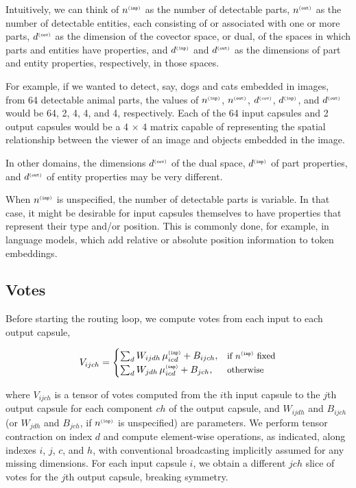 \documentclass[11pt,a4paper]{article}
\newcommand{\suptag}[1]{^{{\scriptscriptstyle\tt (#1)}}}
\newcommand{\cov}{\suptag{cov}}  \newcommand{\inp}{\suptag{inp}}  \newcommand{\out}{\suptag{out}}
\newcommand{\showeqforV}[1]{
	\begin{cases}
		\sum_d W_{ijdh} \, \mu\inp_{icd} + B_{ijch},
		#1 \text{\small if $n\inp$ fixed}
		\\
		\sum_d W_{jdh} \, \mu\inp_{icd} + B_{jch},
		#1 \text{\small otherwise}
	\end{cases}
}
\begin{document}
Intuitively, we can think of $n\inp$ as the number of detectable parts, $n\out$ as the number of detectable entities, each consisting of or associated with one or more parts, $d\cov$ as the dimension of the covector space, or dual, of the spaces in which parts and entities have properties, and $d\inp$ and $d\out$ as the dimensions of part and entity properties, respectively, in those spaces.

For example, if we wanted to detect, say, dogs and cats embedded in images, from 64 detectable animal parts, the values of $n\inp$, $n\out$, $d\cov$, $d\inp$, and $d\out$ would be 64, 2, 4, 4, and 4, respectively. Each of the 64 input capsules and 2 output capsules would be a 4 $\times$ 4 matrix capable of representing the spatial relationship between the viewer of an image and objects embedded in the image.

In other domains, the dimensions $d\cov$ of the dual space, $d\inp$ of part properties, and $d\out$ of entity properties may be very different.

When $n\inp$ is unspecified, the number of detectable parts is variable. In that case, it might be desirable for input capsules themselves to have properties that represent their type and/or position. This is commonly done, for example, in language models, which add relative or absolute position information to token embeddings.

\subsection{Votes}\label{ssec:Computation-of-Votes}

Before starting the routing loop, we compute votes from each input to each output capsule,

\begin{equation}\label{eq:equation_for_V}
V_{ijch} = \showeqforV{&}
\end{equation}

where $V_{ijch}$ is a tensor of votes computed from the $i$th input capsule to the $j$th output capsule for each component $ch$ of the output capsule, and $W_{ijdh}$ and $B_{ijch}$ (or $W_{jdh}$ and $B_{jch}$, if $n\inp$ is unspecified) are parameters. We perform tensor contraction on index $d$ and compute element-wise operations, as indicated, along indexes $i$, $j$, $c$, and $h$, with conventional broadcasting implicitly assumed for any missing dimensions. For each input capsule $i$, we obtain a different $jch$ slice of votes for the $j$th output capsule, breaking symmetry.
\end{document}
